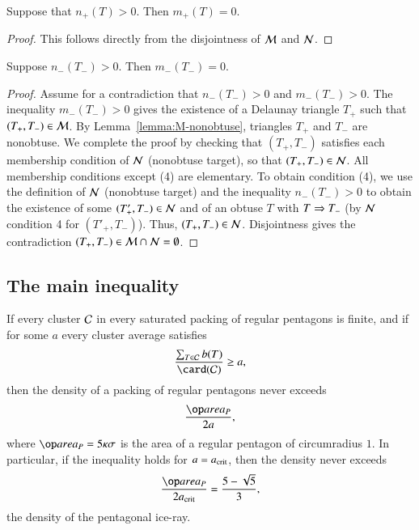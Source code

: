 \begin{lemma}  
  Suppose that $n_+(T)>0$. Then $m_+(T)=0$.
\end{lemma}

\begin{proof} 
  This follows directly from the disjointness of $\mathcal M$ and $\mathcal N$.
\end{proof}

\begin{lemma}  
  Suppose $n_-(T_-)>0$.  Then $m_-(T_-)=0$.
\end{lemma}

\begin{proof}
Assume for a contradiction that $n_-(T_-)>0$ and $m_-(T_-)>0$.  The
inequality $m_-(T_-)>0$ gives the existence of a Delaunay triangle
$T_+$ such that $(T_+,T_-)\in\mathcal M$.  By Lemma~\ref{lemma:M-nonobtuse},
triangles $T_+$ and $T_-$ are nonobtuse.  We complete the proof by
checking that $(T_+,T_-)$ satisfies each membership condition of $\mathcal N$
(nonobtuse target), so that $(T_+,T_-)\in\mathcal N$.  All membership
conditions except (4) are elementary. To obtain condition (4), we use
the definition of $\mathcal N$ (nonobtuse target) and the inequality
$n_-(T_-)>0$ to obtain the existence of some $(T'_+,T_-)\in\mathcal N$ and of
an obtuse $T$ with $T\Rightarrow T_-$ (by $\mathcal N$ condition 4 for $(T'_+,T_-)$).  Thus,
$(T_+,T_-)\in\mathcal N$. Disjointness gives the contradiction
$(T_+,T_-)\in\mathcal M\cap\mathcal N=\emptyset$.
\end{proof}



\subsection{The main inequality}

\begin{lemma}  
If  every cluster $\mathcal C$ in every saturated packing of regular
  pentagons is finite, and if for some $a$ every cluster average
  satisfies
\begin{equation}\libel{eqn:main}
\frac{\sum_{T\in \C} b(T)}{\card(\C)} \ge a,
\end{equation}
then the density of a packing of regular pentagons never exceeds 
\[
\frac{\area_P} {2 a},
\]
where $\area_P = 5\kappa\sigma$ is the area of a regular pentagon of
circumradius $1$.  In particular, if the inequality holds for
$a=a_\text{crit}$, then the density never exceeds
\[
\frac{\area_P}{2 \acrit} = \frac{5 - \sqrt{5}}{3},
\] %
the density of the pentagonal ice-ray.
\end{lemma}

